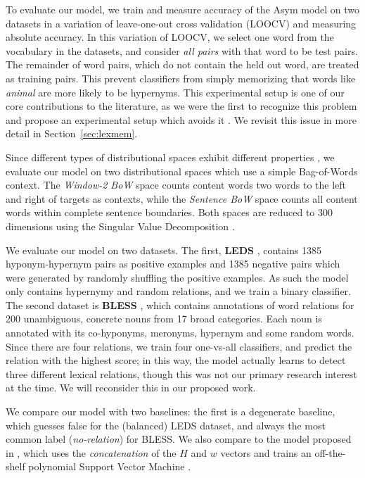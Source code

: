 To evaluate our model, we train and measure accuracy of the Asym model on
two datasets in a variation of leave-one-out cross validation (LOOCV) and
measuring absolute accuracy. In this variation of LOOCV, we select one word
from the vocabulary in the datasets, and consider {\em all pairs} with that
word to be test pairs. The remainder of word pairs, which do not contain the
held out word, are treated as training pairs. This prevent classifiers from
simply memorizing that words like {\em animal} are more likely to be hypernyms.
This experimental setup is one of our core contributions to the literature, as
we were the first to recognize this problem and propose an experimental
setup which avoids it \cite{roller:2014:coling}. We revisit this issue in
more detail in Section~\ref{sec:lexmem}.

Since different types of distributional spaces exhibit different properties
\cite{pado:2007:cl}, we evaluate our model on two distributional
spaces which use a simple Bag-of-Words context.  The {\em Window-2 BoW} space
counts content words two words to the left and right of targets as contexts,
while the {\em Sentence BoW} space counts all content words within complete
sentence boundaries. Both spaces are reduced to 300 dimensions using the
Singular Value Decomposition \cite{landauer:1997:pr}.

We evaluate our model on two datasets. The first, {\bf LEDS}
\cite{baroni:2012:eacl}, contains 1385 hyponym-hypernym pairs as positive
examples and 1385 negative pairs which were generated by randomly shuffling the
positive examples. As such the model only contains hypernymy and random
relations, and we train a binary classifier. The second dataset is {\bf
BLESS} \cite{baroni:2011:gems}, which contains annotations of word relations
for 200 unambiguous, concrete nouns from 17 broad categories. Each noun is
annotated with its co-hyponyms, meronyms, hypernym and some random words.
Since there are four relations, we train four one-vs-all classifiers, and
predict the relation with the highest score; in this way, the model
actually learns to detect three different lexical relations, though this
was not our primary research interest at the time. We will reconsider this in
our proposed work.

We compare our model with two baselines: the first is a degenerate baseline,
which guesses false for the (balanced) LEDS dataset, and always
the most common label ({\em no-relation}) for BLESS. We also compare to the
model proposed in , which uses the {\em concatenation}
of the $H$ and $w$ vectors and trains an off-the-shelf polynomial Support
Vector Machine \cite{cortes:1995:ml}.


